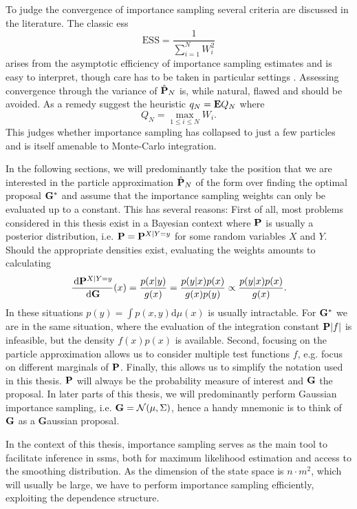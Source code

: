 To judge the convergence of importance sampling several criteria are discussed in the literature. The classic \gls{ess}\cite{Kong1994Sequential} 
$$
\text{ESS} = \frac{1}{\sum_{i = 1}^N W^{2}_{i}}
$$
arises from the asymptotic efficiency of importance sampling estimates and is easy to interpret, though care has to be taken in particular settings . Assessing convergence through the variance of $\hat \P_{N}$ is, while natural, flawed \cite{Chatterjee2018Sample} and should be avoided. As a remedy \cite{Chatterjee2018Sample} suggest the heuristic $q_{N} = \E Q_{N}$ where
$$
Q_{N} = \max_{1\leq i\leq N} W_{i}.
$$
This judges whether importance sampling has collapsed to just a few particles and is itself amenable to Monte-Carlo integration.

In the following sections, we will predominantly take the position that we are interested in the particle approximation $\hat\P_{N}$ of the form  over finding the optimal proposal $\G^{\ast}$  and assume that the importance sampling weights can only be evaluated up to a constant. 
This has several reasons: First of all, most problems considered in this thesis exist in a Bayesian context where $\P$ is usually a posterior distribution, i.e. $\P = \P^{X|Y=y}$ for some random variables $X$ and $Y$. Should the appropriate densities exist, evaluating the weights amounts to calculating 
$$
\rnd{\P^{X| Y= y}}{\G}(x) = \frac{p(x|y)}{g(x)} = \frac{p(y|x)p(x)}{g(x)p(y)} \propto \frac{p(y|x)p(x)}{g(x)}.
$$
In these situations $p(y) = \int p(x,y)\mathrm d \mu(x)$ is usually intractable. For $\G^{\ast}$ we are in the same situation, where the evaluation of the integration constant $\P \lvert f \rvert$ is infeasible, but the density $f(x)p(x)$ is available.
Second, focusing on the particle approximation allows us to consider multiple test functions $f$, e.g. focus on different marginals of $\P$. 
Finally, this allows us to simplify the notation used in this thesis. $\P$ will always be the probability measure of interest and $\G$ the proposal. In later parts of this thesis, we will predominantly perform Gaussian importance sampling, i.e. $\G = \mathcal N(\mu, \Sigma)$, hence a handy mnemonic is to think of $\G$ as a \textbf{G}aussian proposal.


In the context of this thesis, importance sampling serves as the main tool to facilitate inference in \glspl{ssm}, both for maximum likelihood estimation and access to the smoothing distribution. As the dimension of the state space is $n\cdot m^{2}$, which will usually be large, we have to perform importance sampling efficiently, exploiting the dependence structure. 

